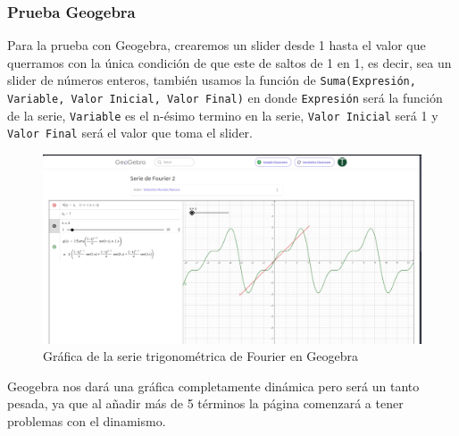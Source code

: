 \subsubsection{Prueba Geogebra}
Para la prueba con Geogebra, crearemos un slider desde 1 hasta el valor que querramos con la única condición de que este de saltos de 1 en 1, es decir, sea un slider de números enteros, también usamos la función de \texttt{Suma(Expresión, Variable, Valor Inicial, Valor Final)} en donde \texttt{Expresión} será la función de la serie, \texttt{Variable} es el n-ésimo termino en la serie, \texttt{Valor Inicial} será 1 y   \texttt{Valor Final} será el valor que toma el slider.
\begin{figure}[H]
	\centering
	\includegraphics[width=1\textwidth]{img/chapter02/geogebra-trig-series.png}
	\caption{Gráfica de la serie trigonométrica de Fourier en Geogebra}
	\label{fig:geogebra-trig-series}  %
\end{figure}
Geogebra nos dará una gráfica completamente dinámica pero será un tanto pesada, ya que al añadir más de 5 términos la página comenzará a tener problemas con el dinamismo.

